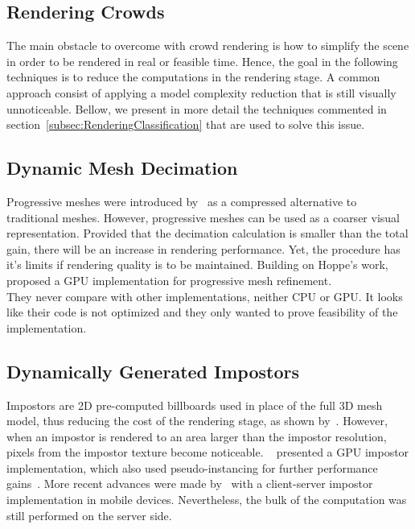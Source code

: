 \documentclass[6pt]{article} %
\begin{document}
\begin{multicols}{2}
\section{Rendering Crowds}

The main obstacle to overcome with crowd rendering is how to simplify the scene in order to be rendered in real or feasible time.
Hence, the goal in the following techniques is to reduce the computations in the rendering stage.
A common approach consist of applying a model complexity reduction that is still visually unnoticeable.
Bellow, we present in more detail the techniques commented in section~\ref{subsec:RenderingClassification} that are used to solve this issue.

\subsection{Dynamic Mesh Decimation}

Progressive meshes were introduced by~\cite{Hoppe1996} as a compressed alternative to traditional meshes.
However, progressive meshes can be used as a coarser visual representation.
Provided that the decimation calculation is smaller than the total gain, there will be an increase in rendering performance.
Yet, the procedure has it's limits if rendering quality is to be maintained.
Building on Hoppe's work, \cite{Hu2009} proposed a GPU implementation for progressive mesh refinement.\\

They never compare with other implementations, neither CPU or GPU.
It looks like their code is not optimized and they only wanted to prove feasibility of the implementation. 

\subsection{Dynamically Generated Impostors}
\label{subsec:DimGenImpostors}

Impostors are 2D pre-computed billboards used in place of the full 3D mesh model, thus reducing the cost of the rendering stage, as shown by~\cite{Aubel2000}.
However, when an impostor is rendered to an area larger than the impostor resolution, pixels from the impostor texture become noticeable.
~\cite{Millan2006} presented a GPU impostor implementation, which also used pseudo-instancing for further performance gains~\cite{zelsnack2004glsl}.
More recent advances were made by~\cite{Ghiletiuc2013} with a client-server impostor implementation in mobile devices.
Nevertheless, the bulk of the computation was still performed on the server side.


\end{multicols}
\end{document}
